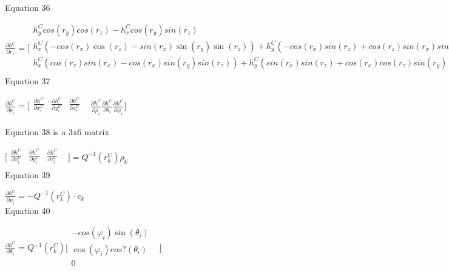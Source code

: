 Equation 36

$\frac{\partial h^{C}}{\partial r_{z}}=\lbrack \begin{matrix}
h_{y}^{C}cos(r_{y})cos(r_{z})-h_{x}^{C}cos(r_{y})sin(r_{z}) & \\
h_{x}^{C}(-cos(r_{x})\cos (r_{z})- sin(r_{x})\sin (r_{y})\sin (r_{z}))+ 
h_{y}^{C}(-cos(r_{x})sin(r_{z})+cos(r_{z})sin(r_{x})sin(r_{y})) & \\

h_{x}^{C}(cos(r_{z})sin(r_{x})-cos(r_{x})sin(r_{y})sin(r_{z}))+h_{y}^{C}(sin(r_{x})sin(r_{z})+cos(r_{x})cos(r_{z})sin(r_{y})) 
& \\
\end{matrix}
\rbrack $\\


Equation 37



\begin{center}$\frac{\partial h^{C}}{\partial p_{i}}=\lbrack 
\begin{matrix}
\frac{\partial h^{C}}{\partial x_{i}^{C}} & \frac{\partial 
h^{C}}{\partial y_{i}^{C}} & \frac{\partial h^{C}}{\partial z_{i}^{C}} & 
\\
\end{matrix}
\frac{\partial h^{C}}{\partial \rho _{i}}\frac{\partial h^{C}}{\partial 
\theta _{i}}\frac{\partial h^{C}}{\partial \varphi _{i}}\rbrack $\\
\end{center}

Equation 38 is a 3x6 matrix

$\lbrack \begin{matrix}
\frac{\partial h^{C}}{\partial x_{i}^{C}} & \frac{\partial 
h^{C}}{\partial y_{i}^{C}} & \frac{\partial h^{C}}{\partial z_{i}^{C}} & 
\\
\end{matrix}
\rbrack =Q^{-1}(r_{k}^{C})\rho _{k}$\\


Equation 39

$\frac{\partial h^{C}}{\partial \rho _{i}}=-Q^{-1}(r_{k}^{C})\cdot 
c_{k}$\\


Equation 40

$\frac{\partial h^{C}}{\partial \theta _{i}}=Q^{-1}(r_{k}^{C})\lbrack 
\begin{matrix}
-cos(\varphi _{i})\sin (\theta _{i}) & \\
\cos (\varphi _{i})cos?(\theta _{i}) & \\
0 & \\
\end{matrix}
\rbrack $\\


